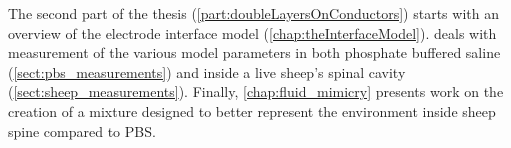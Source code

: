   The second part of the thesis (\cref{part:doubleLayersOnConductors}) starts with an overview of the electrode interface model (\cref{chap:theInterfaceModel}).
   deals with measurement of the various model parameters in both phosphate buffered saline (\cref{sect:pbs_measurements}) and inside a live sheep's spinal cavity (\cref{sect:sheep_measurements}).
  Finally, \cref{chap:fluid_mimicry} presents work on the creation of a mixture designed to better represent the environment inside sheep spine compared to PBS.
